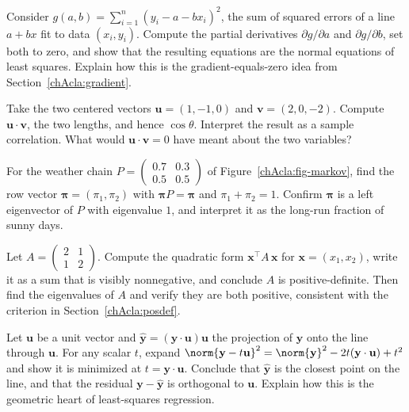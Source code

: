 \begin{exercise}
\label{chAcla:exr-gradient}
Consider $g(a,b)=\sum_{i=1}^n (y_i - a - b x_i)^2$, the sum of squared errors of a line $a+bx$ fit to
data $(x_i,y_i)$. Compute the partial derivatives $\partial g/\partial a$ and $\partial g/\partial b$,
set both to zero, and show that the resulting equations are the normal equations of least squares.
Explain how this is the gradient-equals-zero idea from Section~\ref{chAcla:gradient}.
\end{exercise}

\begin{exercise}
\label{chAcla:exr-cosine}
Take the two centered vectors $\mathbf{u}=(1,-1,0)$ and $\mathbf{v}=(2,0,-2)$. Compute
$\mathbf{u}\cdot\mathbf{v}$, the two lengths, and hence $\cos\theta$. Interpret the result as a
sample correlation. What would $\mathbf{u}\cdot\mathbf{v}=0$ have meant about the two variables?
\end{exercise}

\begin{exercise}
\label{chAcla:exr-eigen}
For the weather chain $P=\left(\begin{smallmatrix} 0.7 & 0.3 \\ 0.5 & 0.5 \end{smallmatrix}\right)$
of Figure~\ref{chAcla:fig-markov}, find the row vector $\boldsymbol\pi=(\pi_1,\pi_2)$ with
$\boldsymbol\pi P=\boldsymbol\pi$ and $\pi_1+\pi_2=1$. Confirm $\boldsymbol\pi$ is a left eigenvector
of $P$ with eigenvalue $1$, and interpret it as the long-run fraction of sunny days.
\end{exercise}

\begin{exercise}
\label{chAcla:exr-posdef}
Let $A=\begin{pmatrix} 2 & 1 \\ 1 & 2 \end{pmatrix}$. Compute the quadratic form
$\mathbf{x}^\top A\,\mathbf{x}$ for $\mathbf{x}=(x_1,x_2)$, write it as a sum that is visibly
nonnegative, and conclude $A$ is positive-definite. Then find the eigenvalues of $A$ and verify they
are both positive, consistent with the criterion in Section~\ref{chAcla:posdef}.
\end{exercise}

\begin{exercise}
\label{chAcla:exr-projection-proof}
Let $\mathbf{u}$ be a unit vector and $\hat{\mathbf{y}}=(\mathbf{y}\cdot\mathbf{u})\mathbf{u}$ the
projection of $\mathbf{y}$ onto the line through $\mathbf{u}$. For any scalar $t$, expand
$\norm{\mathbf{y}-t\mathbf{u}}^2 = \norm{\mathbf{y}}^2 - 2t(\mathbf{y}\cdot\mathbf{u}) + t^2$ and show
it is minimized at $t=\mathbf{y}\cdot\mathbf{u}$. Conclude that $\hat{\mathbf{y}}$ is the closest point
on the line, and that the residual $\mathbf{y}-\hat{\mathbf{y}}$ is orthogonal to $\mathbf{u}$.
Explain how this is the geometric heart of least-squares regression.
\end{exercise}
